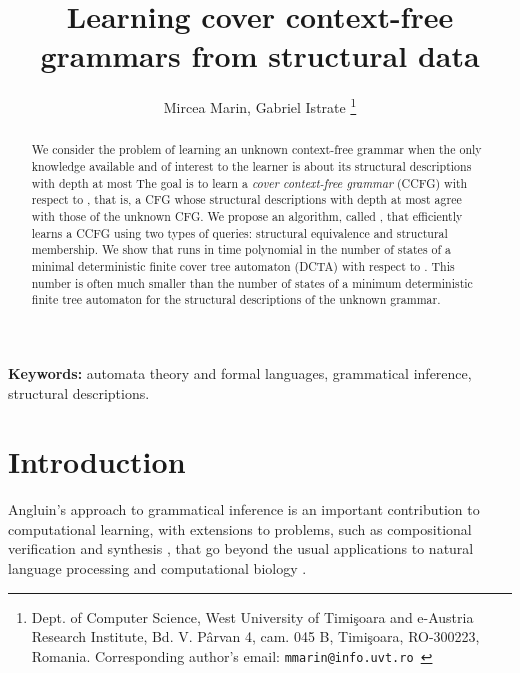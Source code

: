 \documentclass[preprint,12pt,english]{article}
\begin{document}
\title{Learning cover context-free grammars from structural data}



\author{ Mircea Marin, 
Gabriel Istrate \footnote {Dept. of Computer Science, West University of Timi\c{s}oara and e-Austria Research Institute, Bd. V. P\^{a}rvan 4, cam. 045
B, Timi\c{s}oara, RO-300223, Romania. Corresponding author's email: {\tt mmarin@info.uvt.ro }}}



\maketitle
\begin{abstract}
We consider the problem of learning an unknown context-free grammar when the only knowledge available and of interest to the learner is about its structural descriptions with  depth at most  The goal is to learn a {\em cover context-free grammar} (CCFG) with respect to , that is, a CFG whose structural descriptions with depth at most  agree with those of the unknown CFG. 
We propose an algorithm, called ,  that efficiently learns a CCFG using two types of queries: structural equivalence  and structural membership. 
We show that   runs in time polynomial in the number of states of a minimal deterministic finite cover tree automaton (DCTA) with respect to . This number is often much smaller than the number of states of a minimum deterministic finite tree automaton for the structural descriptions of the unknown grammar. 
\end{abstract}

{\bf Keywords:} automata theory and formal languages, grammatical inference, structural descriptions.


\section{Introduction}

Angluin's approach to grammatical inference \cite{Angluin:87} is an important contribution to computational learning, with extensions to problems, such as compositional verification and synthesis \cite{farzan2008extending,maler1995learnability}, that go beyond the usual applications to natural language processing and computational biology \cite{de2010grammatical}. 
\end{document}
